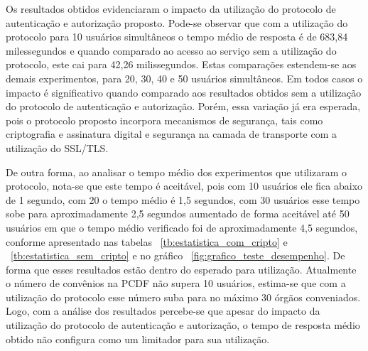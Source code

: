 Os resultados obtidos evidenciaram o impacto da utilização do protocolo de autenticação e autorização proposto. Pode-se observar que com a utilização do protocolo para 10 usuários simultâneos o tempo médio de resposta é de 683,84 milessegundos e quando comparado ao acesso ao serviço sem a utilização do protocolo, este cai para 42,26 milissegundos. Estas comparações estendem-se aos demais experimentos, para 20, 30, 40 e 50 usuários simultâneos. Em todos casos o impacto é significativo quando comparado aos resultados obtidos sem a utilização do protocolo de autenticação e autorização. Porém, essa variação já era esperada, pois o protocolo proposto incorpora mecanismos de segurança, tais como criptografia e assinatura digital e segurança na camada de transporte com a utilização do SSL/TLS.

De outra forma, ao analisar o tempo médio dos experimentos que utilizaram o protocolo, nota-se que este tempo é aceitável, pois com 10 usuários ele fica abaixo de 1 segundo, com 20 o tempo médio é 1,5 segundos, com 30 usuários esse tempo sobe para aproximadamente 2,5 segundos aumentado de forma aceitável até 50 usuários em que o tempo médio verificado foi de aproximadamente 4,5 segundos, conforme apresentado nas tabelas ~\ref{tb:estatistica_com_cripto} e ~\ref{tb:estatistica_sem_cripto} e no gráfico ~\ref{fig:grafico_teste_desempenho}. De forma que esses resultados estão dentro do esperado para utilização. Atualmente o número de convênios na PCDF não supera 10 usuários, estima-se que com a utilização do protocolo esse número suba para no máximo 30 órgãos conveniados. Logo, com a análise dos resultados percebe-se que apesar do impacto da utilização do protocolo de autenticação e autorização, o tempo de resposta médio obtido não configura como um limitador para sua utilização.



